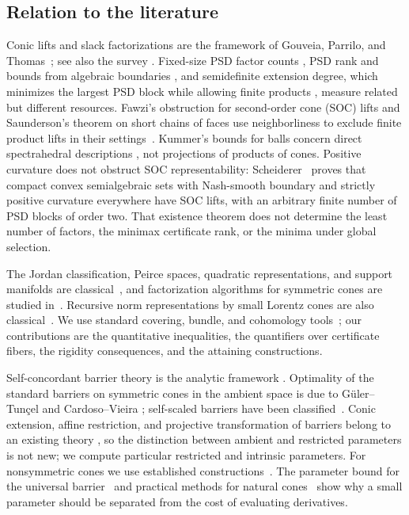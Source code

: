 \subsection{Relation to the literature}
Conic lifts and slack factorizations are the framework of Gouveia,
Parrilo, and Thomas~\cite[Theorem~2.4]{GPT2013}; see also the survey
\citet{FGPPST2022Survey}. Fixed-size PSD factor counts
\citep{FP2013blocks}, PSD rank and bounds from algebraic boundaries
\citep{FGPRT2015,FSED2018}, and semidefinite extension degree, which
minimizes the largest PSD block while allowing finite products
\citep{Averkov2019}, measure related but different resources. Fawzi's
obstruction for second-order cone (SOC) lifts and Saunderson's theorem
on short chains of faces use neighborliness to exclude finite product
lifts in their settings~\citep{Fawzi2019SOC,Saunderson2020}. Kummer's
bounds for balls concern direct spectrahedral descriptions
\citep{Kummer2016}, not projections of products of cones. Positive
curvature does not obstruct SOC representability:
Scheiderer~\cite[Theorem~1.2]{Scheiderer2025SOC} proves that compact
convex semialgebraic sets with Nash-smooth boundary and strictly
positive curvature everywhere have SOC lifts, with an arbitrary finite
number of PSD blocks of order two. That existence theorem does not
determine the least number of factors, the minimax certificate rank, or
the minima under global selection.

The Jordan classification, Peirce spaces, quadratic representations, and
support manifolds are classical~\citep{FK1994,Nomura1994,GS2010}, and
factorization algorithms for symmetric cones are studied
in~\citep{SV2024}. Recursive norm representations by small Lorentz cones
are also classical~\cite[Section~2]{BTN2001}. We use standard covering,
bundle, and cohomology tools~\citep{Hatcher2002,Steenrod1951}; our
contributions are the quantitative inequalities, the quantifiers over
certificate fibers, the rigidity consequences, and the attaining
constructions.

Self-concordant barrier theory is the analytic framework \citep{NN1994}.
Optimality of the standard barriers on symmetric cones in the ambient
space is due to G\"uler--Tun\c{c}el and Cardoso--Vieira
\citep{GT1998,CardosoVieira2006}; self-scaled barriers have been
classified~\citep{HauserGuler2002}. Conic extension, affine restriction,
and projective transformation of barriers belong to an existing theory
\citep{Hildebrand2022Projective}, so the distinction between ambient and
restricted parameters is not new; we compute particular restricted and
intrinsic parameters. For nonsymmetric cones we use established
constructions~\citep{Hildebrand2013,Chares2009,FS2023}. The parameter
bound for the universal barrier~\citep{LeeYue2021} and practical
methods for natural cones~\citep{CKV2022natural} show why a small parameter should be
separated from the cost of evaluating derivatives.

